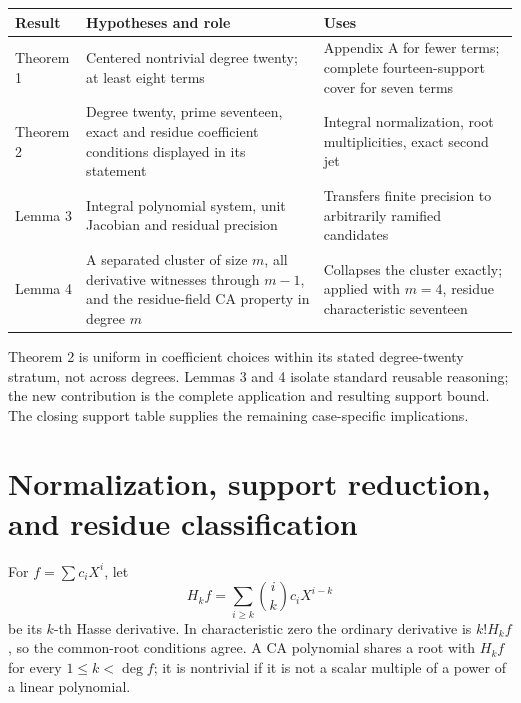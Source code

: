 \documentclass[
  british,
  10pt,
  a4paper,
]{article}
\newcounter{none} %
\begin{document}
{\def\LTcaptype{none} %
\begin{longtable}[]{@{}
  >{\raggedright\arraybackslash}p{}
  >{\raggedright\arraybackslash}p{}
  >{\raggedright\arraybackslash}p{}@{}}
\toprule\noalign{}
\begin{minipage}[b]{\linewidth}\raggedright
Result
\end{minipage} & \begin{minipage}[b]{\linewidth}\raggedright
Hypotheses and role
\end{minipage} & \begin{minipage}[b]{\linewidth}\raggedright
Uses
\end{minipage} \\
\midrule\noalign{}
\endhead
\bottomrule\noalign{}
\endlastfoot
Theorem 1 & Centered nontrivial degree twenty; at least eight terms &
Appendix A for fewer terms; complete fourteen-support cover for seven
terms \\
Theorem 2 & Degree twenty, prime seventeen, exact and residue
coefficient conditions displayed in its statement & Integral
normalization, root multiplicities, exact second jet \\
Lemma 3 & Integral polynomial system, unit Jacobian and residual
precision & Transfers finite precision to arbitrarily ramified
candidates \\
Lemma 4 & A separated cluster of size \(m\), all derivative witnesses
through \(m-1\), and the residue-field CA property in degree \(m\) &
Collapses the cluster exactly; applied with \(m=4\), residue
characteristic seventeen \\
\end{longtable}
}

Theorem 2 is uniform in coefficient choices within its stated
degree-twenty stratum, not across degrees. Lemmas 3 and 4 isolate
standard reusable reasoning; the new contribution is the complete
application and resulting support bound. The closing support table
supplies the remaining case-specific implications.

\section{Normalization, support reduction, and residue
classification}\label{normalization-support-reduction-and-residue-classification}

For \(f=\sum c_iX^i\), let \[
 H_kf=\sum_{i\ge k}\binom{i}{k}c_iX^{i-k}
\] be its \(k\)-th Hasse derivative. In characteristic zero the ordinary
derivative is \(k!H_kf\), so the common-root conditions agree. A CA
polynomial shares a root with \(H_kf\) for every \(1\le k<\deg f\); it
is nontrivial if it is not a scalar multiple of a power of a linear
polynomial.
\end{document}
